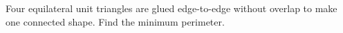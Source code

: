Four equilateral unit triangles are glued edge-to-edge without overlap to make one connected shape. Find the minimum perimeter.
